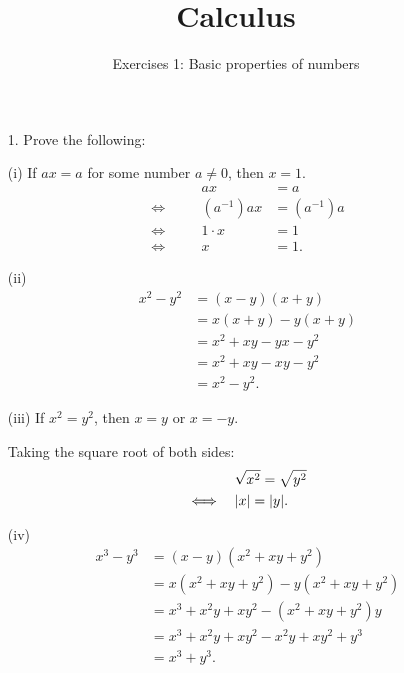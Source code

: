 \documentclass[11pt]{article}
\title{Calculus}
\subtitle{Exercises 1: Basic properties of numbers}
\author{}
\date{}
\begin{document}
\maketitle
\begin{enumerate}

    \item[1.] Prove the following:

    \item[(i)] If $ax = a$ for some number $a \neq 0$, then $x = 1$.
          \[
              \begin{alignedat}{2}
                             &  & ax           & = a          \\
                  \iff \quad &  & (a^{-1}) a x & = (a^{-1}) a \\
                  \iff \quad &  & 1 \cdot x    & = 1          \\
                  \iff \quad &  & x            & = 1.
              \end{alignedat}
          \]

    \item[(ii)]
          \[
              \begin{aligned}
                  x^2 - y^2 & = (x - y)(x + y)        \\
                            & = x (x + y) - y (x + y) \\
                            & = x^2 + xy - yx - y^2   \\
                            & = x^2 + xy - xy - y^2   \\
                            & = x^2 - y^2.
              \end{aligned}
          \]

    \item[(iii)] If $x^2 = y^2$, then $x = y$ or $x = -y$.

          \vspace{6pt}
          Taking the square root of both sides:
          \[
              \begin{aligned}
                             & \sqrt{x^2} = \sqrt{y^2} \\
                  \iff \quad & \lvert x\rvert = \lvert y\rvert.
              \end{aligned}
          \]

    \item[(iv)]
          \[
              \begin{aligned}
                  x^3 - y^3 & = (x - y)(x^2 + xy + y^2)               \\
                            & = x(x^2 + xy + y^2) - y(x^2 + xy + y^2) \\
                            & = x^3 + x^2y + xy^2 - (x^2 + xy + y^2)y \\
                            & = x^3 + x^2y + xy^2 - x^2y + xy^2 + y^3 \\
                            & = x^3 + y^3.
              \end{aligned}
          \]


\end{enumerate}
\end{document}
